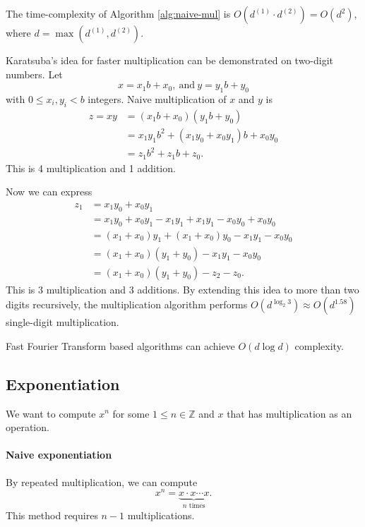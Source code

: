 \documentclass{article}
\newcommand{\Z}{\mathbb{Z}}
\begin{document}
The time-complexity of Algorithm \ref{alg:naive-mul} is $O(d^{(1)} \cdot d^{(2)})=O(d^2)$, where $d=\max\left( d^{(1)}, d^{(2)}\right)$.

Karatsuba's idea for faster multiplication can be demonstrated on two-digit numbers. Let
\[
    x = x_1 b + x_0,\ \textrm{and}\ y = y_1 b + y_0
\]
with $0 \le x_i, y_i < b$ integers.
Naive multiplication of $x$ and $y$ is
\begin{align*}
    z = xy &= \left(x_1 b + x_0 \right)\left(y_1 b + y_0 \right) \\
           &= x_1 y_1 b^2 + \left(x_1 y_0 + x_0 y_1\right)b + x_0 y_0 \\
           &= z_1 b^2 + z_1 b + z_0.
\end{align*}
This is 4 multiplication and 1 addition.

Now we can express
\begin{align*}
    z_1 &= x_1 y_0 + x_0 y_1 \\
        &= x_1 y_0 + x_0 y_1 - x_1 y_1 + x_1 y_1 - x_0 y_0 + x_0 y_0 \\
        &= \left(x_1 + x_0\right)y_1 + \left(x_1 + x_0\right)y_0 - x_1 y_1 - x_0 y_0 \\
        &= \left(x_1 + x_0\right)\left(y_1 + y_0\right) - x_1 y_1 - x_0 y_0 \\
        &= \left(x_1 + x_0\right)\left(y_1 + y_0\right) - z_2 - z_0.
\end{align*}
This is 3 multiplication and 3 additions.
By extending this idea to more than two digits recursively, the multiplication algorithm performs $O(d^{\log_2 3}) \approx O(d^{1.58})$ single-digit multiplication.

Fast Fourier Transform based algorithms can achieve $O(d \log d)$ complexity.

\subsection{Exponentiation}

We want to compute $x^n$ for some $1 \le n \in \Z$ and $x$ that has multiplication as an operation.

\paragraph{Naive exponentiation}
By repeated multiplication, we can compute
\[
    x^n = \underbrace{x \cdot x \cdots x}_\textrm{$n$ times}.
\]
This method requires $n-1$ multiplications.
\end{document}
